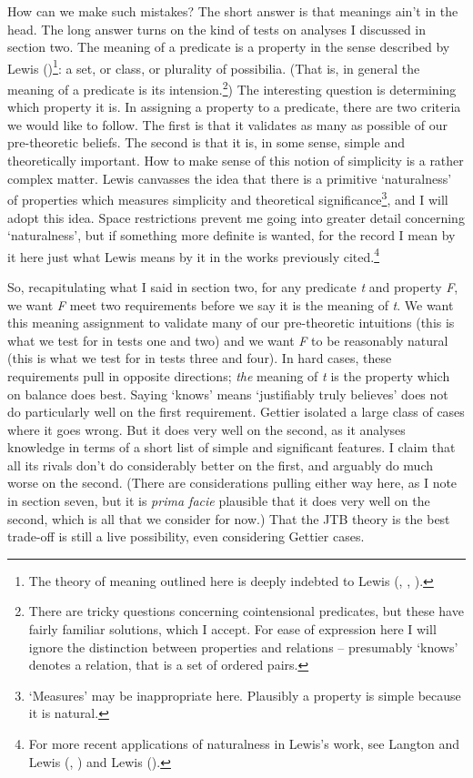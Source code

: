 \documentclass[
  10pt,
  letterpaper,
  DIV=11,
  numbers=noendperiod,
  twoside]{scrartcl}
\begin{document}
How can we make such mistakes? The short answer is that meanings ain't
in the head. The long answer turns on the kind of tests on analyses I
discussed in section two. The meaning of a predicate is a property in
the sense described by Lewis
()\footnote{The theory of meaning
  outlined here is deeply indebted to Lewis
  (, ,
  ).}: a set, or class, or plurality of
possibilia. (That is, in general the meaning of a predicate is its
intension.\footnote{There are tricky questions concerning cointensional
  predicates, but these have fairly familiar solutions, which I accept.
  For ease of expression here I will ignore the distinction between
  properties and relations -- presumably `knows' denotes a relation,
  that is a set of ordered pairs.}) The interesting question is
determining which property it is. In assigning a property to a
predicate, there are two criteria we would like to follow. The first is
that it validates as many as possible of our pre-theoretic beliefs. The
second is that it is, in some sense, simple and theoretically important.
How to make sense of this notion of simplicity is a rather complex
matter. Lewis canvasses the idea that there is a primitive `naturalness'
of properties which measures simplicity and theoretical
significance\footnote{`Measures' may be inappropriate here. Plausibly a
  property is simple because it is natural.}, and I will adopt this
idea. Space restrictions prevent me going into greater detail concerning
`naturalness', but if something more definite is wanted, for the record
I mean by it here just what Lewis means by it in the works previously
cited.\footnote{For more recent applications of naturalness in Lewis's
  work, see Langton and Lewis (,
  ) and Lewis
  ().}

So, recapitulating what I said in section two, for any predicate
\emph{t} and property \emph{F}, we want \emph{F} meet two requirements
before we say it is the meaning of \emph{t}. We want this meaning
assignment to validate many of our pre-theoretic intuitions (this is
what we test for in tests one and two) and we want \emph{F} to be
reasonably natural (this is what we test for in tests three and four).
In hard cases, these requirements pull in opposite directions;
\emph{the} meaning of \emph{t} is the property which on balance does
best. Saying `knows' means `justifiably truly believes' does not do
particularly well on the first requirement. Gettier isolated a large
class of cases where it goes wrong. But it does very well on the second,
as it analyses knowledge in terms of a short list of simple and
significant features. I claim that all its rivals don't do considerably
better on the first, and arguably do much worse on the second. (There
are considerations pulling either way here, as I note in section seven,
but it is \emph{prima facie} plausible that it does very well on the
second, which is all that we consider for now.) That the JTB theory is
the best trade-off is still a live possibility, even considering Gettier
cases.
\end{document}
